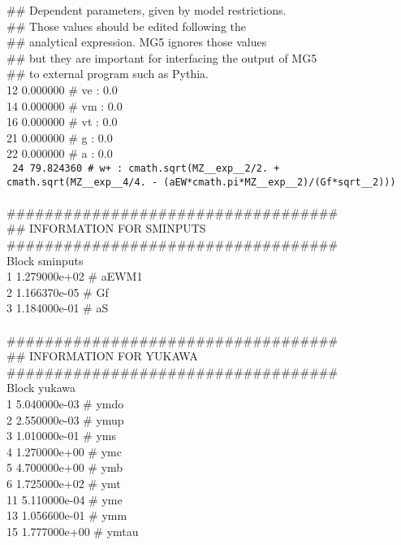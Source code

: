 {\#\# Dependent parameters, given by model restrictions.\\
\#\# Those values should be edited following the \\
\#\# analytical expression. MG5 ignores those values\\ 
\#\# but they are important for interfacing the output of MG5\\
\#\# to external program such as Pythia.\\
  12 0.000000 \# ve : 0.0 \\
  14 0.000000 \# vm : 0.0 \\
  16 0.000000 \# vt : 0.0 \\
  21 0.000000 \# g : 0.0 \\
  22 0.000000 \# a : 0.0 \\
\texttt{  24 79.824360 \# w+ : cmath.sqrt(MZ\_\_exp\_\_2/2. + cmath.sqrt(MZ\_\_exp\_\_4/4. - (aEW*cmath.pi*MZ\_\_exp\_\_2)/(Gf*sqrt\_\_2)))} \\
\\
\#\#\#\#\#\#\#\#\#\#\#\#\#\#\#\#\#\#\#\#\#\#\#\#\#\#\#\#\#\#\#\#\#\#\#\\
\#\# INFORMATION FOR SMINPUTS\\
\#\#\#\#\#\#\#\#\#\#\#\#\#\#\#\#\#\#\#\#\#\#\#\#\#\#\#\#\#\#\#\#\#\#\#\\
Block sminputs \\
    1 1.279000e+02 \# aEWM1 \\
    2 1.166370e-05 \# Gf \\
    3 1.184000e-01 \# aS \\
\\
\#\#\#\#\#\#\#\#\#\#\#\#\#\#\#\#\#\#\#\#\#\#\#\#\#\#\#\#\#\#\#\#\#\#\#\\
\#\# INFORMATION FOR YUKAWA\\
\#\#\#\#\#\#\#\#\#\#\#\#\#\#\#\#\#\#\#\#\#\#\#\#\#\#\#\#\#\#\#\#\#\#\#\\
Block yukawa \\
    1 5.040000e-03 \# ymdo \\
    2 2.550000e-03 \# ymup \\
    3 1.010000e-01 \# yms \\
    4 1.270000e+00 \# ymc \\
    5 4.700000e+00 \# ymb \\
    6 1.725000e+02 \# ymt \\
   11 5.110000e-04 \# yme \\
   13 1.056600e-01 \# ymm \\
   15 1.777000e+00 \# ymtau \\
}
